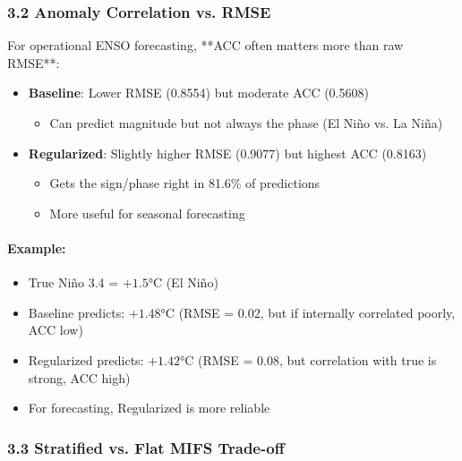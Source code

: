 \documentclass[12pt,a4paper]{article}
\begin{document}
\subsubsection*{3.2 Anomaly Correlation vs. RMSE}

For operational ENSO forecasting, **ACC often matters more than raw RMSE**:

\begin{itemize}
    \item \textbf{Baseline}: Lower RMSE (0.8554) but moderate ACC (0.5608)
    \begin{itemize}
        \item Can predict magnitude but not always the phase (El Niño vs. La Niña)
    \end{itemize}
    \item \textbf{Regularized}: Slightly higher RMSE (0.9077) but highest ACC (0.8163)
    \begin{itemize}
        \item Gets the sign/phase right in 81.6\% of predictions
        \item More useful for seasonal forecasting
    \end{itemize}
\end{itemize}

\paragraph{Example:}
\begin{itemize}
    \item True Niño 3.4 = $+1.5°$C (El Niño)
    \item Baseline predicts: $+1.48°$C (RMSE = 0.02, but if internally correlated poorly, ACC low)
    \item Regularized predicts: $+1.42°$C (RMSE = 0.08, but correlation with true is strong, ACC high)
    \item For forecasting, Regularized is more reliable
\end{itemize}

\subsubsection*{3.3 Stratified vs. Flat MIFS Trade-off}
\end{document}
